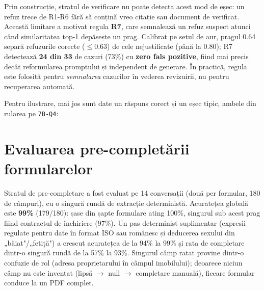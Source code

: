 Prin construcție, stratul de verificare nu poate detecta acest mod de eșec: un refuz trece de R1-R6 fără să conțină vreo citație sau document de verificat. Această limitare a motivat regula \textbf{R7}, care semnalează un refuz suspect atunci când similaritatea top-1 depășește un prag. Calibrat pe setul de aur, pragul 0.64 separă refuzurile corecte ($\leq$0.63) de cele nejustificate (până la 0.80); R7 detectează \textbf{24 din 33} de cazuri (73\%) cu \textbf{zero fals pozitive}, fiind mai precis decât reformularea promptului și independent de generare. În practică, regula este folosită pentru \emph{semnalarea} cazurilor în vederea revizuirii, nu pentru recuperarea automată.

Pentru ilustrare, mai jos sunt date un răspuns corect și un eșec tipic, ambele din rularea pe \texttt{7B-Q4}:

\begin{center}
\setlength{\fboxsep}{7pt}%
\end{center}

\section{Evaluarea pre-completării formularelor}

Stratul de pre-completare a fost evaluat pe 14 conversații (două per formular, 180 de câmpuri), cu o singură rundă de extracție deterministă. Acuratețea globală este \textbf{99\%} (179/180): șase din șapte formulare ating 100\%, singurul sub acest prag fiind contractul de închiriere (97\%). Un pas determinist suplimentar (expresii regulate pentru date în format ISO sau românesc și deducerea sexului din „băiat"/„fetiță") a crescut acuratețea de la 94\% la 99\% și rata de completare dintr-o singură rundă de la 57\% la 93\%. Singurul câmp ratat provine dintr-o confuzie de rol (adresa proprietarului în câmpul imobilului); deoarece niciun câmp nu este inventat (lipsă $\to$ null $\to$ completare manuală), fiecare formular conduce la un PDF complet.

